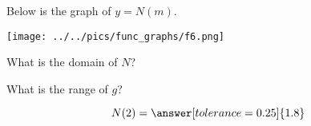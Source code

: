 \documentclass{ximera}
\author{Lee Wayand}
\begin{document}
\begin{exercise}  





Below is the graph of $y=N(m)$.  

\begin{image}
\texttt{[image: ../../pics/func\_graphs/f6.png]}
\end{image}









\begin{question} 


What is the domain of $N$?\\


\begin{multipleChoice}
\choice {$[-1, 6]$}
\choice [correct]{$[-1, 6)$}
\choice {$[-1, 2) \cup  (2, 6)$}
\choice {$[-1, 2) \cup  (2, 6]$}
\end{multipleChoice}

\end{question}






\begin{question} 


What is the range of $g$?\\


\begin{multipleChoice}
\choice {$[-3.2, 4.5]$}
\choice {$[-3.2, 4.5)$}
\choice [correct]{$[-3.2, -2.2) \cup  [1.8, 4.5)$}
\choice {$[-1, 2) \cup  (2, 6)$}
\end{multipleChoice}


\end{question}









\begin{question} 



\[  N(2) = \answer[tolerance=0.25]{1.8}  \]

\end{question}










\begin{question} 




\end{question}
\end{exercise}
\end{document}
